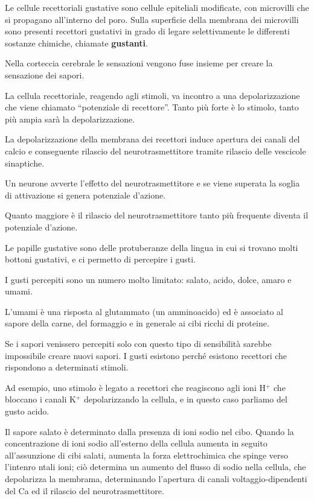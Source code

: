 \documentclass[]{article}
\begin{document}
Le cellule recettoriali gustative sono cellule epiteliali modificate,
con microvilli che si propagano all'interno del poro. Sulla superficie
della membrana dei microvilli sono presenti recettori gustativi in grado
di legare selettivamente le differenti sostanze chimiche, chiamate
\textbf{gustanti}.

Nella corteccia cerebrale le sensazioni vengono fuse insieme per creare
la sensazione dei sapori.

La cellula recettoriale, reagendo agli stimoli, va incontro a una
depolarizzazione che viene chiamato ``potenziale di recettore''. Tanto
più forte è lo stimolo, tanto più ampia sarà la depolarizzazione.

La depolarizzazione della membrana dei recettori induce apertura dei
canali del calcio e conseguente rilascio del neurotrasmettitore tramite
rilascio delle vescicole sinaptiche.

Un neurone avverte l'effetto del neurotrasmettitore e se viene superata
la soglia di attivazione si genera potenziale d'azione.

Quanto maggiore è il rilascio del neurotrasmettitore tanto più frequente
diventa il potenziale d'azione.

Le papille gustative sono delle protuberanze della lingua in cui si
trovano molti bottoni gustativi, e ci permetto di percepire i gusti.

I gusti percepiti sono un numero molto limitato: salato, acido, dolce,
amaro e umami.

L'umami è una risposta al glutammato (un amminoacido) ed è associato al
sapore della carne, del formaggio e in generale ai cibi ricchi di
proteine.

Se i sapori venissero percepiti solo con questo tipo di sensibilità
sarebbe impossibile creare nuovi sapori. I gusti esistono perché
esistono recettori che rispondono a determinati stimoli.

Ad esempio, uno stimolo è legato a recettori che reagiscono agli ioni
H\(^+\) che bloccano i canali K\(^+\) depolarizzando la cellula, e in
questo caso parliamo del gusto acido.

Il sapore salato è determinato dalla presenza di ioni sodio nel cibo.
Quando la concentrazione di ioni sodio all'esterno della cellula aumenta
in seguito all'assunzione di cibi salati, aumenta la forza
elettrochimica che spinge verso l'intenro ntali ioni; ciò determina un
aumento del flusso di sodio nella cellula, che depolarizza la membrama,
determinando l'apertura di canali voltaggio-dipendenti del Ca ed il
rilascio del neurotrasmettitore.
\end{document}
